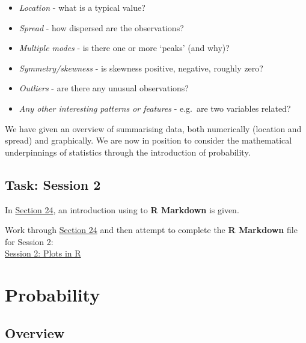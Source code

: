 \documentclass[
]{book}
\providecommand{\tightlist}{%
  \setlength{\itemsep}{0pt}\setlength{\parskip}{0pt}}
\begin{document}
\begin{itemize}
\tightlist
\item
  \emph{Location} - what is a typical value?\\
\item
  \emph{Spread} - how dispersed are the observations?\\
\item
  \emph{Multiple modes} - is there one or more `peaks' (and why)?\\
\item
  \emph{Symmetry/skewness} - is skewness positive, negative, roughly zero?\\
\item
  \emph{Outliers} - are there any unusual observations?\\
\item
  \emph{Any other interesting patterns or features} - e.g.~are two variables related?
\end{itemize}

We have given an overview of summarising data, both numerically (location and spread) and graphically. We are now in position to consider the mathematical underpinnings of statistics through the introduction of probability.

\hypertarget{visual:lab}{%
\section*{\texorpdfstring{{\textbf{Task: Session 2}}}{Task: Session 2}}\label{visual:lab}}

In \protect\hyperlink{Rmark}{Section 24}, an introduction using to \textbf{R Markdown} is given.

Work through \protect\hyperlink{Rmark}{Section 24} and then attempt to complete the \textbf{R Markdown} file for Session 2:\\
\href{https://moodle.nottingham.ac.uk/course/view.php?id=134982\#section-2}{Session 2: Plots in R}

\hypertarget{prob}{%
\chapter{Probability}\label{prob}}

\hypertarget{prob:overview}{%
\section{Overview}\label{prob:overview}}
\end{document}
